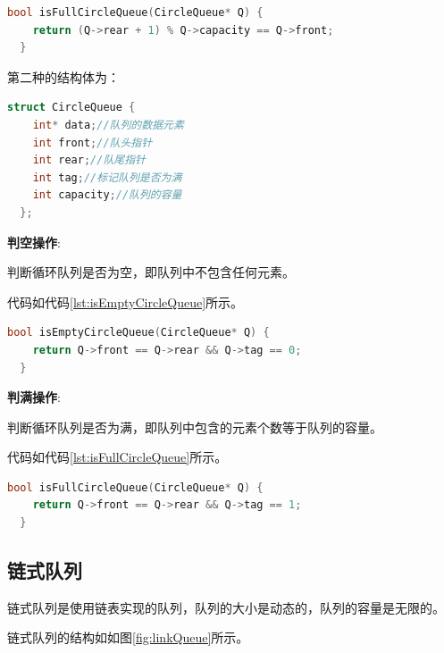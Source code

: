 \documentclass[lang=cn,newtx,10pt,scheme=chinese]{../elegantbook}
\begin{document}
\begin{lstlisting}[language=C++, caption={判断循环队列是否为满示例代码}, label={lst:isFullCircleQueue}]
  bool isFullCircleQueue(CircleQueue* Q) {
    return (Q->rear + 1) % Q->capacity == Q->front;
  }

\end{lstlisting}

第二种的结构体为：

\begin{lstlisting}[language=C++, caption={循环队列结构体定义}, label={lst:circleQueueStruct}]
  struct CircleQueue {
    int* data;//队列的数据元素
    int front;//队头指针
    int rear;//队尾指针
    int tag;//标记队列是否为满
    int capacity;//队列的容量
  };
\end{lstlisting}

\textbf{判空操作}:

判断循环队列是否为空，即队列中不包含任何元素。

代码如代码\ref{lst:isEmptyCircleQueue}所示。

\begin{lstlisting}[language=C++, caption={判断循环队列是否为空示例代码}, label={lst:isEmptyCircleQueue}]
  bool isEmptyCircleQueue(CircleQueue* Q) {
    return Q->front == Q->rear && Q->tag == 0;
  }

\end{lstlisting}

\textbf{判满操作}:

判断循环队列是否为满，即队列中包含的元素个数等于队列的容量。

代码如代码\ref{lst:isFullCircleQueue}所示。

\begin{lstlisting}[language=C++, caption={判断循环队列是否为满示例代码}, label={lst:isFullCircleQueue}]
  bool isFullCircleQueue(CircleQueue* Q) {
    return Q->front == Q->rear && Q->tag == 1;
  }

\end{lstlisting}

\subsection{链式队列}

链式队列是使用链表实现的队列，队列的大小是动态的，队列的容量是无限的。

链式队列的结构如如图\ref{fig:linkQueue}所示。
\end{document}
